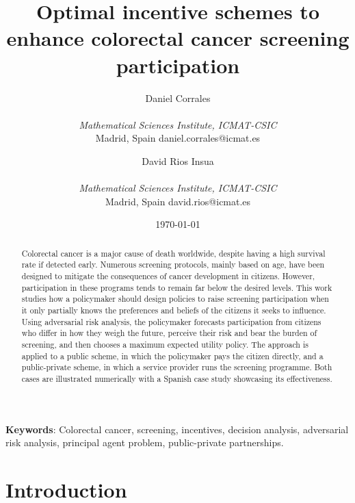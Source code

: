 \documentclass[12pt]{article}
\makeatletter
\providecommand{\IEEEauthorblockN}[1]{#1\\}
\providecommand{\IEEEauthorblockA}[1]{{\small\begin{tabular}[t]{@{}c@{}}#1\end{tabular}}}
\makeatother
\begin{document}
\title{Optimal incentive schemes to enhance colorectal cancer screening participation
}

\author{\IEEEauthorblockN{Daniel Corrales}
\IEEEauthorblockA{\textit{Mathematical Sciences Institute, ICMAT-CSIC}\\
Madrid, Spain daniel.corrales@icmat.es}
\and
\IEEEauthorblockN{David Rios Insua}
\IEEEauthorblockA{\textit{Mathematical Sciences Institute, ICMAT-CSIC}\\
Madrid, Spain david.rios@icmat.es}
}

\date{\today}

\maketitle
\begin{abstract}
Colorectal cancer is a major cause of death worldwide, despite having a high survival rate if detected early. Numerous screening protocols, mainly based on age, have been designed to mitigate the consequences of cancer development in citizens. However, participation in these programs tends to remain far below the desired levels. This work studies how a policymaker should design policies to raise screening participation when it only partially knows the preferences and beliefs of the citizens it seeks to influence. Using adversarial risk analysis, the policymaker forecasts participation from citizens who differ in how they weigh the future, perceive their risk and bear the burden of screening, and then chooses a maximum expected utility policy. The approach is applied to a public scheme, in which the policymaker pays the citizen directly, and a public-private scheme, in which a service provider runs the screening programme. Both cases are illustrated numerically with a Spanish case study showcasing its effectiveness.
\end{abstract}

\begin{small}
\textbf{Keywords}: Colorectal cancer, screening, incentives, decision analysis, adversarial risk analysis, principal agent problem, public-private partnerships.     
\end{small}



\section{Introduction}\label{intro}
 
\end{document}
